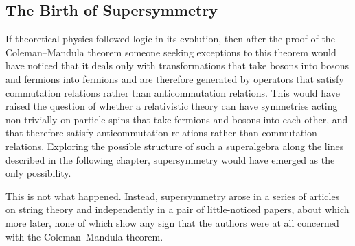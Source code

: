 \subsection{The Birth of Supersymmetry}

If theoretical physics followed logic in its evolution, then after the proof
of the Coleman--Mandula theorem someone seeking exceptions to this theorem
would have noticed that it deals only with transformations that take bosons
into bosons and fermions into fermions and are therefore generated by
operators that satisfy commutation relations rather than anticommutation
relations. This would have raised the question of whether a relativistic
theory can have symmetries acting non-trivially on particle spins that take
fermions and bosons into each other, and that therefore satisfy
anticommutation relations rather than commutation relations. Exploring the
possible structure of such a superalgebra along the lines described in the
following chapter, supersymmetry would have emerged as the only possibility.

This is not what happened. Instead, supersymmetry arose in a series of
articles on string theory and independently in a pair of little-noticed
papers, about which more later, none of which show any sign that the authors
were at all concerned with the Coleman--Mandula theorem.

